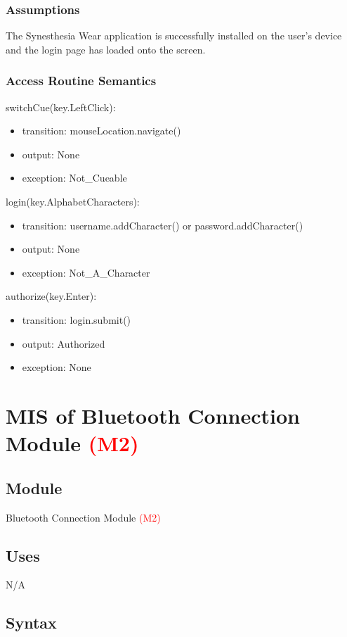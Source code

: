 \documentclass[12pt, titlepage]{article}
\begin{document}
\subsubsection{Assumptions}

The Synesthesia Wear application is successfully installed on the user's device and the login page has loaded onto the screen. 

\subsubsection{Access Routine Semantics}

\noindent switchCue(key.LeftClick):
\begin{itemize}
\item transition: mouseLocation.navigate() 
\item output: None
\item exception: Not\_Cueable 
\end{itemize}

\noindent login(key.AlphabetCharacters):
\begin{itemize}
\item transition: username.addCharacter() or password.addCharacter()
\item output: None
\item exception: Not\_A\_Character 
\end{itemize}


\noindent authorize(key.Enter):
\begin{itemize}
\item transition: login.submit() 
\item output: Authorized
\item exception: None 
\end{itemize}

\newpage 


\section{MIS of Bluetooth Connection Module \textcolor{red}{(M2)}} \label{Bluetooth Connection Module}
\subsection{Module}
Bluetooth Connection Module \textcolor{red}{(M2)}
\subsection{Uses}
N/A
\subsection{Syntax}
\end{document}
